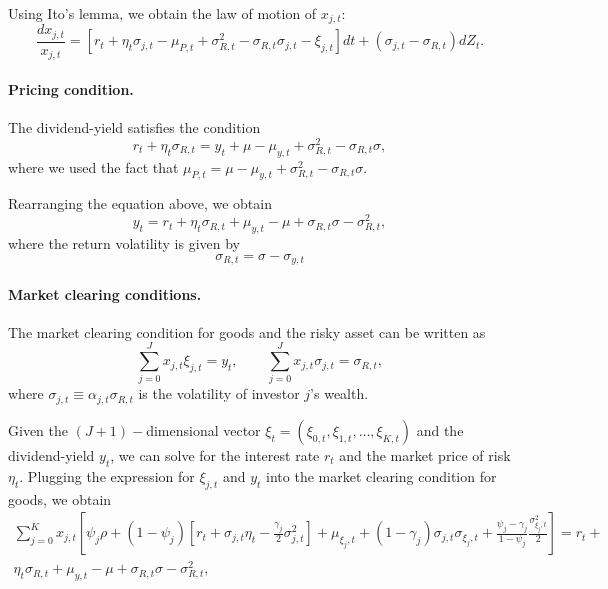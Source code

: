 \documentclass[11pt,english]{article}
\begin{document}
Using Ito's lemma, we obtain the law of motion of $x_{j,t}$:
\begin{equation*}
    \frac{d x_{j,t}}{x_{j,t}} = \left[ r_t + \eta_t \sigma_{j,t} - \mu_{P,t} + \sigma_{R,t}^2 - \sigma_{R,t} \sigma_{j,t} - \xi_{j,t} \right] dt + (\sigma_{j,t} - \sigma_{R,t})   d Z_t.
\end{equation*}

\paragraph{Pricing condition.} The dividend-yield satisfies the condition
\begin{equation}
    r_t + \eta_t \sigma_{R,t} = y_t + \mu - \mu_{y,t} + \sigma_{R,t}^2 - \sigma_{R,t} \sigma,
\end{equation}
where we used the fact that $\mu_{P,t} = \mu - \mu_{y,t} + \sigma_{R,t}^2 - \sigma_{R,t} \sigma$.

Rearranging the equation above, we obtain
\begin{equation}
    y_t = r_t + \eta_t \sigma_{R,t} + \mu_{y,t} - \mu + \sigma_{R,t} \sigma - \sigma_{R,t}^2,
\end{equation}
where the return volatility is given by
\begin{equation}
    \sigma_{R,t} = \sigma - \sigma_{y,t}
\end{equation}

\paragraph{Market clearing conditions.} The market clearing condition for goods and the risky asset can be written as
\begin{equation*}
    \sum_{j=0}^J x_{j,t} \xi_{j,t} = y_t, \qquad \sum_{j=0}^J x_{j,t} \sigma_{j,t} = \sigma_{R,t},
 \end{equation*}
where $\sigma_{j,t} \equiv \alpha_{j,t} \sigma_{R,t}$ is the volatility of investor $j$'s wealth.

Given the $(J+1)-$dimensional vector $\xi_t = (\xi_{0,t}, \xi_{1,t},\ldots, \xi_{K,t})$ and the dividend-yield $y_t$, we can solve for the interest rate $r_t$ and the market price of risk $\eta_t$. Plugging the expression for $\xi_{j,t}$ and $y_t$ into the market clearing condition for goods, we obtain\small
\begin{align}
    \sum_{j=0}^K x_{j,t} \left[ \psi_j \rho + (1-\psi_j) \left[ r_t + \sigma_{j,t} \eta_t - \frac{\gamma_j}{2}  \sigma_{j,t}^2    \right] + \mu_{\xi_j,t} 
    + (1-\gamma_j) \sigma_{j,t} \sigma_{\xi_j,t}
    + \frac{\psi_j - \gamma_j}{1-\psi_j} \frac{\sigma_{\xi_j,t}^2}{2} \right] = r_t + \nonumber\\
    \eta_t \sigma_{R,t} + \mu_{y,t} - \mu + \sigma_{R,t} \sigma - \sigma_{R,t}^2,
\end{align}\normalsize
\end{document}
